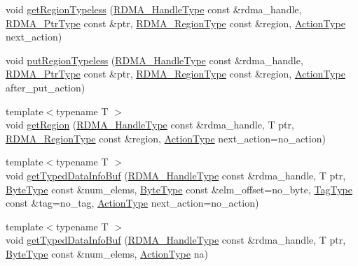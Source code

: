 \begin{DoxyCompactItemize}
void \hyperlink{structvt_1_1rdma_1_1_r_d_m_a_manager_a108e405a633745d46c2d68a1a0727b7c}{get\+Region\+Typeless} (\hyperlink{namespacevt_a10442579ec4e7ebef223818e64bcf908}{R\+D\+M\+A\+\_\+\+Handle\+Type} const \&rdma\+\_\+handle, \hyperlink{namespacevt_a9e2c953286c7616f7c218e9951790776}{R\+D\+M\+A\+\_\+\+Ptr\+Type} const \&ptr, \hyperlink{structvt_1_1rdma_1_1_r_d_m_a_manager_aafc574f533ebf5b34c1389ef504448bf}{R\+D\+M\+A\+\_\+\+Region\+Type} const \&region, \hyperlink{namespacevt_ae0a5a7b18cc99d7b732cb4d44f46b0f3}{Action\+Type} next\+\_\+action)
\item 
void \hyperlink{structvt_1_1rdma_1_1_r_d_m_a_manager_a2e34becca8d5f72a7d460e6574f8f623}{put\+Region\+Typeless} (\hyperlink{namespacevt_a10442579ec4e7ebef223818e64bcf908}{R\+D\+M\+A\+\_\+\+Handle\+Type} const \&rdma\+\_\+handle, \hyperlink{namespacevt_a9e2c953286c7616f7c218e9951790776}{R\+D\+M\+A\+\_\+\+Ptr\+Type} const \&ptr, \hyperlink{structvt_1_1rdma_1_1_r_d_m_a_manager_aafc574f533ebf5b34c1389ef504448bf}{R\+D\+M\+A\+\_\+\+Region\+Type} const \&region, \hyperlink{namespacevt_ae0a5a7b18cc99d7b732cb4d44f46b0f3}{Action\+Type} after\+\_\+put\+\_\+action)
\item 
{\footnotesize template$<$typename T $>$ }\\void \hyperlink{structvt_1_1rdma_1_1_r_d_m_a_manager_a06506f3abad91d02456d88f4b1e4db1b}{get\+Region} (\hyperlink{namespacevt_a10442579ec4e7ebef223818e64bcf908}{R\+D\+M\+A\+\_\+\+Handle\+Type} const \&rdma\+\_\+handle, T ptr, \hyperlink{structvt_1_1rdma_1_1_r_d_m_a_manager_aafc574f533ebf5b34c1389ef504448bf}{R\+D\+M\+A\+\_\+\+Region\+Type} const \&region, \hyperlink{namespacevt_ae0a5a7b18cc99d7b732cb4d44f46b0f3}{Action\+Type} next\+\_\+action=no\+\_\+action)
\item 
{\footnotesize template$<$typename T $>$ }\\void \hyperlink{structvt_1_1rdma_1_1_r_d_m_a_manager_a267d1a2da52abf259119da964b9051f0}{get\+Typed\+Data\+Info\+Buf} (\hyperlink{namespacevt_a10442579ec4e7ebef223818e64bcf908}{R\+D\+M\+A\+\_\+\+Handle\+Type} const \&rdma\+\_\+handle, T ptr, \hyperlink{namespacevt_aab8d55968084610ce3b17057981e9300}{Byte\+Type} const \&num\+\_\+elems, \hyperlink{namespacevt_aab8d55968084610ce3b17057981e9300}{Byte\+Type} const \&elm\+\_\+offset=no\+\_\+byte, \hyperlink{namespacevt_a84ab281dae04a52a4b243d6bf62d0e52}{Tag\+Type} const \&tag=no\+\_\+tag, \hyperlink{namespacevt_ae0a5a7b18cc99d7b732cb4d44f46b0f3}{Action\+Type} next\+\_\+action=no\+\_\+action)
\item 
{\footnotesize template$<$typename T $>$ }\\void \hyperlink{structvt_1_1rdma_1_1_r_d_m_a_manager_a59f4ee000f6c382289fa6c186962d1d1}{get\+Typed\+Data\+Info\+Buf} (\hyperlink{namespacevt_a10442579ec4e7ebef223818e64bcf908}{R\+D\+M\+A\+\_\+\+Handle\+Type} const \&rdma\+\_\+handle, T ptr, \hyperlink{namespacevt_aab8d55968084610ce3b17057981e9300}{Byte\+Type} const \&num\+\_\+elems, \hyperlink{namespacevt_ae0a5a7b18cc99d7b732cb4d44f46b0f3}{Action\+Type} na)

\end{DoxyCompactItemize}
